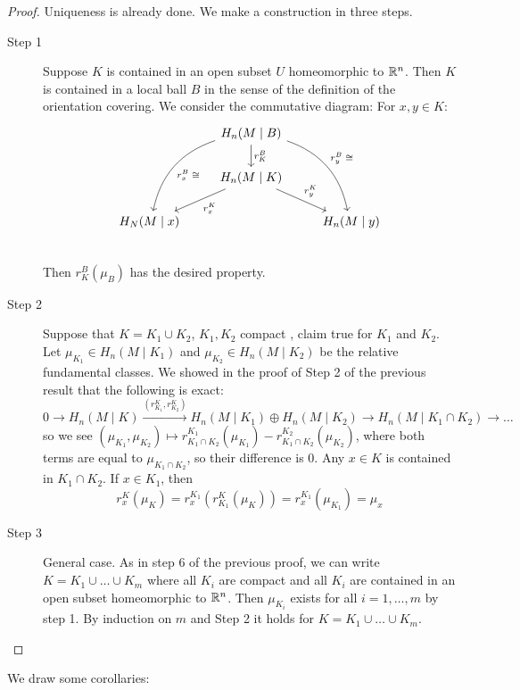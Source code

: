 \documentclass[language=english]{TemplateLecture}
\begin{document}
\begin{proof}
    Uniqueness is already done. We make a construction in three steps.
    \begin{description}
        \item[Step 1] Suppose \(K\) is contained in an open subset \(U\) homeomorphic to \(\mathbb{R}^n\). Then \(K\) is contained in a local ball \(B\) in the sense of the definition of the orientation covering. We consider the commutative diagram:
        For \(x, y \in K\):
        \[\begin{tikzcd}
            &H_n(M \mid B) \ar[d, "r_K^B"]\ar[ldd, bend right, "r_x^B \; \cong"] \ar[ddr, bend left, "r_y^B \; \cong"] & \\
            &H_n(M \mid K) \ar[ld, "r_x^K"] \ar[dr, "r_y^K"] & \\
            H_N(M \mid x)&  & H_n(M \mid y) \\
        \end{tikzcd}\]
        Then \(r_K^B(\mu_B)\) has the desired property.

        \item[Step 2] Suppose that \(K = K_1 \cup K_2\), \(K_1, K_2\) compact , claim true for \(K_1\) and \(K_2\). Let \(\mu_{K_1} \in H_n(M \mid K_1)\) and \(\mu_{K_2} \in H_n(M \mid K_2)\) be the relative fundamental classes. We showed in the proof of Step 2 of the previous result that the following is exact:
        \[0 \to H_n(M \mid K) \xrightarrow{(r_{K_1}^K, r_{K_2}^K)} H_n(M \mid K_1) \oplus H_n(M \mid K_2) \to H_n(M \mid K_1 \cap K_2) \to \dots\]
        so we see \((\mu_{K_1}, \mu_{K_2}) \mapsto r_{K_1 \cap K_2}^{K_1}(\mu_{K_1}) - r_{K_1 \cap K_2}^{K_2}(\mu_{K_2})\), where both terms are equal to \(\mu_{K_1 \cap K_2}\), so their difference is \(0\). Any \(x \in K\) is contained in \(K_1 \cap K_2\). If \(x \in K_1\), then
        \[r_x^K(\mu_K) = r_x^{K_1}(r_{K_1}^K(\mu_K)) = r_x^{K_1}(\mu_{K_1}) = \mu_x\]

        \item[Step 3] General case. As in step 6 of the previous proof, we can write \(K = K_1 \cup \dots \cup K_m\) where all \(K_i\) are compact and all \(K_i\) are contained in an open subset homeomorphic to \(\mathbb{R}^n\). Then \(\mu_{K_i}\) exists for all \(i = 1, \dots, m\) by step 1. By induction on \(m\) and Step 2 it holds for \(K = K_1 \cup \dots \cup K_m\).
    \end{description}
\end{proof}

We draw some corollaries:
\end{document}
